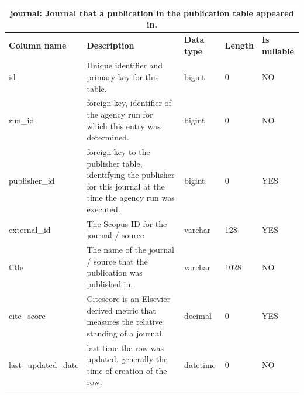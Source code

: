 \documentclass[titlepage, 11pt]{article}
\begin{document}
{\begin{table}[h!]
{\begin{tabularx}{1\textwidth} {|p{4cm}|p{5.33cm}|p{2cm}|p{1.5cm}|p{1.5cm}|}
\end{tabularx}
\label{table: appendix b - issn}
}
\end{table}

\begin{table}[h!]

{\renewcommand{\arraystretch}{1.5}%
\begin{tabularx}{1\textwidth} {|p{4cm}|p{5.33cm}|p{2cm}|p{1.5cm}|p{1.5cm}|}
 \hline
 \multicolumn{5}{|c|}{\textbf{journal: Journal that a publication in the publication table appeared in.}}\\
 \hline
 \textbf{Column name} & \textbf{Description} & \textbf{Data type} & \textbf{Length} & \textbf{Is nullable} \\
 \hline
 id & Unique identifier and primary key for this table. & bigint   & 0    & NO  \\
 \hline
 run\_id & foreign key, identifier of the agency run for which this entry was determined. & bigint   & 0    & NO  \\
 \hline
 publisher\_id & foreign key to the publisher table, identifying the publisher for this journal at the time the agency run was executed. & bigint  & 0 & YES \\
 \hline
 external\_id & The Scopus ID for the journal / source & varchar  & 128  & YES \\
 \hline
 title & The name of the journal / source that the publication was published in.        & varchar  & 1028 & NO  \\
\hline
cite\_score   & Citescore is an Elsevier derived metric that measures the relative standing of a journal. & decimal & 0 & YES \\
\hline
last\_updated\_date & last time the row was updated. generally the time of creation of the row. & datetime & 0  & NO \\
\hline

\end{tabularx}
\label{table: appendix b - journal}
}
\end{table}

\begin{table}[h!]


\end{table}}
\end{document}
